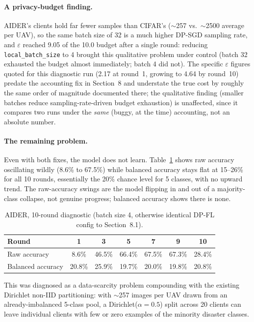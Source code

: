 \documentclass[12pt,a4paper]{article}
\begin{document}
\paragraph{A privacy-budget finding.} AIDER's clients hold far fewer samples
than CIFAR's ($\sim$257 vs.\ $\sim$2500 average per UAV), so the same
batch size of 32 is a much higher DP-SGD sampling rate, and $\varepsilon$
reached 9.05 of the 10.0 budget after a single round: reducing
\texttt{local\_batch\_size} to 4 brought this qualitative problem under
control (batch 32 exhausted the budget almost immediately; batch 4 did
not). The specific $\varepsilon$ figures quoted for this diagnostic run
(2.17 at round~1, growing to 4.64 by round~10) predate the accounting fix
in Section~8 and understate the true cost by roughly the same order of
magnitude documented there; the qualitative finding (smaller batches
reduce sampling-rate-driven budget exhaustion) is unaffected, since it
compares two runs under the \emph{same} (buggy, at the time) accounting,
not an absolute number.

\paragraph{The remaining problem.} Even with both fixes, the model does not
learn. Table~\ref{tab:aider-diagnosis} shows raw accuracy oscillating wildly
(8.6\% to 67.5\%) while balanced accuracy stays flat at 15--26\% for all 10
rounds, essentially the 20\% chance level for 5 classes, with no upward
trend. The raw-accuracy swings are the model flipping in and out of a
majority-class collapse, not genuine progress; balanced accuracy shows there
is none.

\begin{table}[H]
  \centering
  \caption{AIDER, 10-round diagnostic (batch size 4, otherwise identical
  DP-FL config to Section~8.1).}
  \label{tab:aider-diagnosis}
  \begin{tabular}{lcccccc}
    \toprule
    Round & 1 & 3 & 5 & 7 & 9 & 10\\
    \midrule
    Raw accuracy & 8.6\% & 46.5\% & 66.4\% & 67.5\% & 67.3\% & 28.4\%\\
    Balanced accuracy & 20.8\% & 25.9\% & 19.7\% & 20.0\% & 19.8\% & 20.8\%\\
    \bottomrule
  \end{tabular}
\end{table}

This was diagnosed as a data-scarcity problem compounding with the existing
Dirichlet non-IID partitioning: with $\sim$257 images per UAV drawn from an
already-imbalanced 5-class pool, a Dirichlet($\alpha=0.5$) split across 20
clients can leave individual clients with few or zero examples of the
minority disaster classes.
\end{document}
